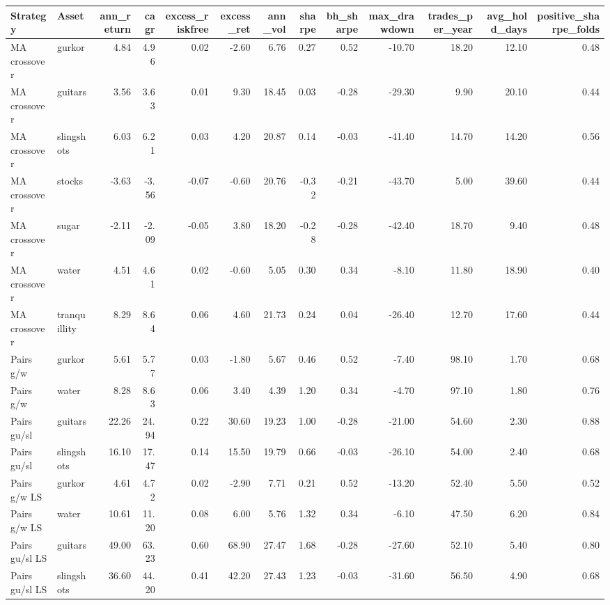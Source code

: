 \begin{tabular}{llrrrrrrrrrrr}
\toprule
Strategy & Asset & ann_return & cagr & excess_riskfree & excess_ret & ann_vol & sharpe & bh_sharpe & max_drawdown & trades_per_year & avg_hold_days & positive_sharpe_folds \\
\midrule
MA crossover & gurkor & 4.84 & 4.96 & 0.02 & -2.60 & 6.76 & 0.27 & 0.52 & -10.70 & 18.20 & 12.10 & 0.48 \\
MA crossover & guitars & 3.56 & 3.63 & 0.01 & 9.30 & 18.45 & 0.03 & -0.28 & -29.30 & 9.90 & 20.10 & 0.44 \\
MA crossover & slingshots & 6.03 & 6.21 & 0.03 & 4.20 & 20.87 & 0.14 & -0.03 & -41.40 & 14.70 & 14.20 & 0.56 \\
MA crossover & stocks & -3.63 & -3.56 & -0.07 & -0.60 & 20.76 & -0.32 & -0.21 & -43.70 & 5.00 & 39.60 & 0.44 \\
MA crossover & sugar & -2.11 & -2.09 & -0.05 & 3.80 & 18.20 & -0.28 & -0.28 & -42.40 & 18.70 & 9.40 & 0.48 \\
MA crossover & water & 4.51 & 4.61 & 0.02 & -0.60 & 5.05 & 0.30 & 0.34 & -8.10 & 11.80 & 18.90 & 0.40 \\
MA crossover & tranquillity & 8.29 & 8.64 & 0.06 & 4.60 & 21.73 & 0.24 & 0.04 & -26.40 & 12.70 & 17.60 & 0.44 \\
Pairs g/w & gurkor & 5.61 & 5.77 & 0.03 & -1.80 & 5.67 & 0.46 & 0.52 & -7.40 & 98.10 & 1.70 & 0.68 \\
Pairs g/w & water & 8.28 & 8.63 & 0.06 & 3.40 & 4.39 & 1.20 & 0.34 & -4.70 & 97.10 & 1.80 & 0.76 \\
Pairs gu/sl & guitars & 22.26 & 24.94 & 0.22 & 30.60 & 19.23 & 1.00 & -0.28 & -21.00 & 54.60 & 2.30 & 0.88 \\
Pairs gu/sl & slingshots & 16.10 & 17.47 & 0.14 & 15.50 & 19.79 & 0.66 & -0.03 & -26.10 & 54.00 & 2.40 & 0.68 \\
Pairs g/w LS & gurkor & 4.61 & 4.72 & 0.02 & -2.90 & 7.71 & 0.21 & 0.52 & -13.20 & 52.40 & 5.50 & 0.52 \\
Pairs g/w LS & water & 10.61 & 11.20 & 0.08 & 6.00 & 5.76 & 1.32 & 0.34 & -6.10 & 47.50 & 6.20 & 0.84 \\
Pairs gu/sl LS & guitars & 49.00 & 63.23 & 0.60 & 68.90 & 27.47 & 1.68 & -0.28 & -27.60 & 52.10 & 5.40 & 0.80 \\
Pairs gu/sl LS & slingshots & 36.60 & 44.20 & 0.41 & 42.20 & 27.43 & 1.23 & -0.03 & -31.60 & 56.50 & 4.90 & 0.68 \\
\bottomrule
\end{tabular}
